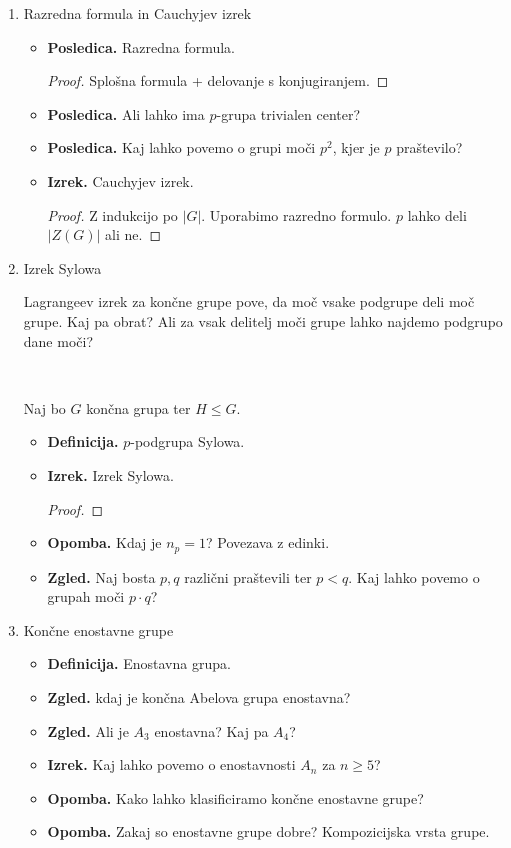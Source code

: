 \begin{enumerate}
    \item Razredna formula in Cauchyjev izrek
    \begin{itemize}
        \item \textbf{Posledica.} Razredna formula.
        \begin{proof}
            Splošna formula + delovanje s konjugiranjem.
        \end{proof}
        \item \textbf{Posledica.} Ali lahko ima \(p\)-grupa trivialen center?
        \item \textbf{Posledica.} Kaj lahko povemo o grupi moči \(p^2\), kjer je \(p\) praštevilo?
        \item \textbf{Izrek.} Cauchyjev izrek. \todo{*}
        \begin{proof}
            Z indukcijo po \(|G|\). Uporabimo razredno formulo. \(p\) lahko deli \(|Z(G)|\) ali ne.
        \end{proof}
    \end{itemize}

    \item Izrek Sylowa
    
    Lagrangeev izrek za končne grupe pove, da moč vsake podgrupe deli moč grupe. Kaj pa obrat? Ali za vsak delitelj moči grupe lahko najdemo podgrupo dane moči?
    
    \ 

    Naj bo \(G\) končna grupa ter \(H \leq G\).
    \begin{itemize}
        \item \textbf{Definicija.} \(p\)-podgrupa Sylowa.
        \item \textbf{Izrek.} Izrek Sylowa. \todo{*}
        \begin{proof}
            \todo{}
        \end{proof}
        \item \textbf{Opomba.} Kdaj je \(n_p = 1\)? Povezava z edinki.
        \item \textbf{Zgled.} Naj bosta \(p, q\) različni praštevili ter \(p < q\). Kaj lahko povemo o grupah moči \(p \cdot q\)?
    \end{itemize}

    \item Končne enostavne grupe
    \begin{itemize}
        \item \textbf{Definicija.} Enostavna grupa.
        \item \textbf{Zgled.} kdaj je končna Abelova grupa enostavna?
        \item \textbf{Zgled.} Ali je \(A_3\) enostavna? Kaj pa \(A_4\)?
        \item \textbf{Izrek.} Kaj lahko povemo o enostavnosti \(A_n\) za \(n \geq 5\)?
        \item \textbf{Opomba.} Kako lahko klasificiramo končne enostavne grupe?
        \item \textbf{Opomba.} Zakaj so enostavne grupe dobre? Kompozicijska vrsta grupe.
    \end{itemize}


\end{enumerate}
